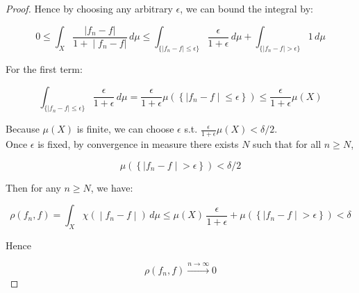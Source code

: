 \documentclass{qlnotes-export}
\begin{document}
\begin{proof}
Hence by choosing any arbitrary \(\epsilon\), we can bound the integral by:

\[0 \leq \int_{X}\frac{|f_{n} - f|}{\left. 1 + \middle| f_{n} - f| \right.}\, d\mu \leq \int_{\{{|f_{n} - f| \leq \epsilon}\}}\frac{\epsilon}{1 + \epsilon}\, d\mu + \int_{\{{|f_{n} - f| > \epsilon}\}}1\, d\mu\]

For the first term:

\[\int_{\{{|f_{n} - f| \leq \epsilon}\}}\frac{\epsilon}{1 + \epsilon}\, d\mu = \frac{\epsilon}{1 + \epsilon}\mu(\left\{ |f_{n} - f \middle| \leq \epsilon \right\}) \leq \frac{\epsilon}{1 + \epsilon}\mu(X)\]

Because \(\mu(X)\) is finite, we can choose \(\epsilon\) s.t. \(\frac{\epsilon}{1 + \epsilon}\mu(X) < \delta/2\).\\
Once \(\epsilon\) is fixed, by convergence in measure there exists \(N\) such that for all \(n \geq N\),

\[\mu(\left\{ |f_{n} - f \middle| > \epsilon \right\}) < \delta/2\]

Then for any \(n \geq N\), we have:

\[\left. \rho(f_{n},f) = \int_{X}\chi( \middle| f_{n} - f \middle| )\, d\mu \leq \mu(X)\,\frac{\epsilon}{1 + \epsilon} + \mu(\left\{ |f_{n} - f \middle| > \epsilon \right\}) < \delta \right.\]

Hence

\[\rho(f_{n},f)\overset{n\rightarrow\infty}{\rightarrow}0\]

\end{proof}
\end{document}
